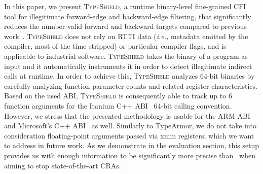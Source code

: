 In this paper, we present \textsc{TypeShield}, a runtime binary-level fine-grained CFI tool for 
illegitimate forward-edge and backward-edge filtering, 
that significantly reduces the number valid forward and backward targets compared to previous work~\cite{veen:typearmor}. 
\textsc{TypeShield} does not rely on RTTI data (\textit{i.e.,} metadata emitted by the compiler, most of the time stripped) or 
particular compiler flags, and is applicable to industrial software.
\textsc{TypeShield} takes the binary of a program as input and it automatically instruments it in order
to detect illegitimate indirect calls at runtime. In order to achieve this, 
\textsc{TypeShield} analyzes 64-bit binaries by carefully analyzing function parameter counts and related register
characteristics. Based on the used ABI, \textsc{TypeShield} is consequently able to track up to 6 function arguments for the 
Itanium C++ ABI~\cite{itanium:abi} 64-bit calling convention.
However, we stress that the presented methodology is usable for the ARM ABI~\cite{arm:abi} and Microsoft's C++ ABI~\cite{microsoft:abi} as well.
Similarly to TypeArmor, we do not take into consideration floating-point arguments passed via xmm registers; which we want to address in future work. 
As we demonstrate in the evaluation section, this setup provides us with enough information to be significantly more precise than~\cite{veen:typearmor} 
when aiming to stop state-of-the-art CRAs.


